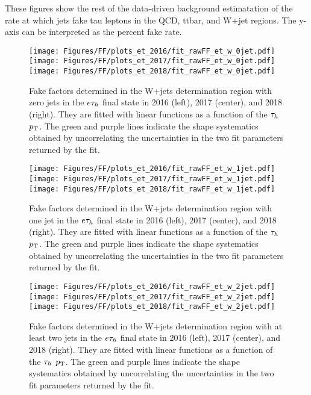 These figures show the rest of the data-driven background estimatation of the rate at which jets fake tau leptons in the QCD, ttbar, and W+jet regions. The y-axis can be interpreted as the percent fake rate. 

\begin{figure}[ht!b]
\centering
\texttt{[image: Figures/FF/plots\_et\_2016/fit\_rawFF\_et\_w\_0jet.pdf]}
\texttt{[image: Figures/FF/plots\_et\_2017/fit\_rawFF\_et\_w\_0jet.pdf]}
\texttt{[image: Figures/FF/plots\_et\_2018/fit\_rawFF\_et\_w\_0jet.pdf]}\\
\caption{\label{fig:fit_raw_et_0jet_w} Fake factors determined in the W+jets determination region with zero jets in the $e\tau_h$ final state in 2016 (left), 2017 (center), and 2018 (right). They are fitted with linear functions as a function of the $\tau_h$ $p_{\mathrm{T}}$. The green and purple lines indicate the shape systematics obtained by uncorrelating the uncertainties in the two fit parameters returned by the fit.  }
\end{figure}

\begin{figure}[ht!b]
\centering
\texttt{[image: Figures/FF/plots\_et\_2016/fit\_rawFF\_et\_w\_1jet.pdf]}
\texttt{[image: Figures/FF/plots\_et\_2017/fit\_rawFF\_et\_w\_1jet.pdf]}
\texttt{[image: Figures/FF/plots\_et\_2018/fit\_rawFF\_et\_w\_1jet.pdf]}\\
\caption{\label{fig:fit_raw_et_1jet_w} Fake factors determined in the W+jets determination region with one jet in the $e\tau_h$ final state in 2016 (left), 2017 (center), and 2018 (right). They are fitted with linear functions as a function of the $\tau_h$ $p_{\mathrm{T}}$. The green and purple lines indicate the shape systematics obtained by uncorrelating the uncertainties in the two fit parameters returned by the fit.  }
\end{figure}

\begin{figure}[ht!b]
\centering
\texttt{[image: Figures/FF/plots\_et\_2016/fit\_rawFF\_et\_w\_2jet.pdf]}
\texttt{[image: Figures/FF/plots\_et\_2017/fit\_rawFF\_et\_w\_2jet.pdf]}
\texttt{[image: Figures/FF/plots\_et\_2018/fit\_rawFF\_et\_w\_2jet.pdf]}\\
\caption{\label{fig:fit_raw_et_2jet_w} Fake factors determined in the W+jets determination region with at least two jets in the $e\tau_h$ final state in 2016 (left), 2017 (center), and 2018 (right). They are fitted with linear functions as a function of the $\tau_h$ $p_{\mathrm{T}}$. The green and purple lines indicate the shape systematics obtained by uncorrelating the uncertainties in the two fit parameters returned by the fit.  }
\end{figure}


